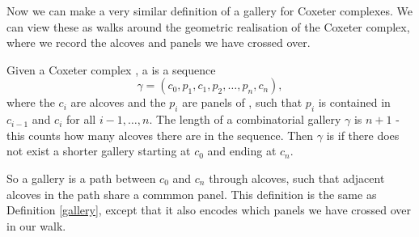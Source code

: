 \documentclass[11pt]{article}
\begin{document}







Now we can make a very similar definition of a gallery for Coxeter complexes. We can view these as walks around the geometric realisation of the Coxeter complex, where we record the alcoves and panels we have crossed over. 

\begin{definition}\label{comb.gallery}
    Given a Coxeter complex \sg, a  is a sequence
    \[\gamma = (c_0,p_1,c_1,p_2,\hdots  ,p_n,c_n),\]
    where the $c_i$ are alcoves and the $p_i$ are panels of \sg, such that $p_i$ is contained in $c_{i-1}$ and $c_{i}$ for all $i-1,\hdots ,n$. The length of a combinatorial gallery $\gamma$ is $n+1$ - this counts how many alcoves there are in the sequence. Then $\gamma$ is  if there does not exist a shorter gallery starting at $c_0$ and ending at $c_n$. 
\end{definition}


So a gallery is a path between $c_0$ and $c_n$ through alcoves, such that adjacent alcoves in the path share a commmon panel. This definition is the same as Definition \ref{gallery}, except that it also encodes which panels we have crossed over in our walk. 
\end{document}
